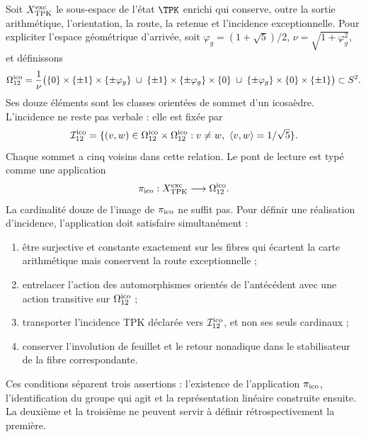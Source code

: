 Soit \(X_{\rm TPK}^{\rm exc}\) le sous-espace de l’état \(\TPK\) enrichi
qui conserve, outre la sortie arithmétique, l’orientation, la route,
la retenue et l’incidence exceptionnelle. Pour expliciter l’espace géométrique d’arrivée,
soit \(\varphi_g=(1+\sqrt5)/2\), \(\nu=\sqrt{1+\varphi_g^2}\), et définissons
\begin{equation}
\label{rm:eq:gravity-icosahedron-vertices}
\Omega_{12}^{\rm ico}
=\frac1\nu\bigl(
\{0\}\times\{\pm1\}\times\{\pm\varphi_g\}
\;\cup\;
\{\pm1\}\times\{\pm\varphi_g\}\times\{0\}
\;\cup\;
\{\pm\varphi_g\}\times\{0\}\times\{\pm1\}
\bigr)\subset S^2.
\end{equation}
Ses douze éléments sont les classes orientées de sommet d’un icosaèdre.
L’incidence ne reste pas verbale : elle est fixée par
\begin{equation}
\label{rm:eq:gravity-icosahedron-incidence}
\mathcal I_{12}^{\rm ico}
=\{(v,w)\in\Omega_{12}^{\rm ico}\times\Omega_{12}^{\rm ico}:
v\neq w,\ \langle v,w\rangle=1/\sqrt5\}.
\end{equation}
Chaque sommet a cinq voisins dans cette relation. Le pont de lecture
est typé comme une application
\begin{equation}
\label{rm:eq:gravity-exceptional-reader-map}
\pi_{\rm ico}:X_{\rm TPK}^{\rm exc}\longrightarrow\Omega_{12}^{\rm ico}.
\end{equation}
La cardinalité douze de l’image de \(\pi_{\rm ico}\) ne suffit pas. Pour définir une réalisation d’incidence, l’application doit satisfaire simultanément :
\begin{enumerate}[label=(\roman*)]
\item être surjective et constante exactement sur les fibres qui écartent
la carte arithmétique mais conservent la route exceptionnelle ;
\item entrelacer l’action des automorphismes orientés de l’antécédent
avec une action transitive sur \(\Omega_{12}^{\rm ico}\) ;
\item transporter l’incidence TPK déclarée vers
\(\mathcal I_{12}^{\rm ico}\), et non
ses seuls cardinaux ;
\item conserver l’involution de feuillet et le retour nonadique dans le
stabilisateur de la fibre correspondante.
\end{enumerate}

Ces conditions séparent trois assertions : l’existence de l’application \(\pi_{\rm ico}\), l’identification du groupe qui agit et la représentation linéaire construite ensuite. La deuxième et la troisième ne peuvent servir à définir rétrospectivement la première.

